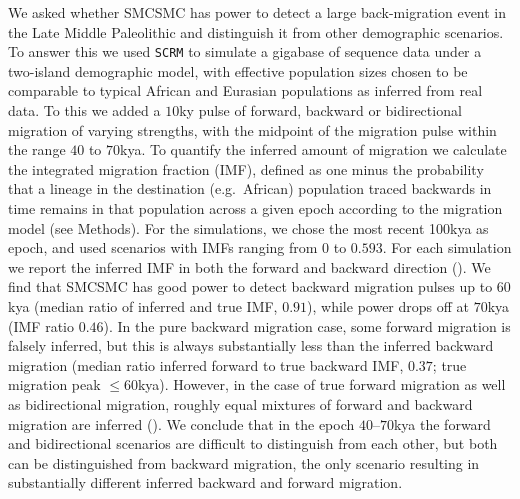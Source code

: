 We asked whether SMCSMC has power to detect a large back-migration event in the Late Middle Paleolithic and distinguish it from other demographic scenarios. To answer this we used {\tt SCRM} \cite{Staab2015} to simulate a gigabase of sequence data under a two-island demographic model,
with effective population sizes chosen to be comparable to typical African and Eurasian populations as inferred from real data. 
To this we added a $10$ky pulse of forward, backward or bidirectional migration of varying strengths, with the midpoint of the migration pulse within the range $40$ to $70$kya.  To quantify the inferred amount of migration we calculate the integrated migration fraction (IMF), defined as one minus the probability that a lineage in the destination (e.g.\ African) population traced backwards in time remains in that population across a given epoch according to the migration model (see Methods).  For the simulations, we chose the most recent 100kya as epoch, and used scenarios with IMFs ranging from $0$ to $0.593$. For each simulation we report the inferred IMF in both the forward and backward direction (). We find that SMCSMC has good power to detect backward migration pulses up to $60$kya (median ratio of inferred and true IMF, $0.91$), while power drops off at $70$kya (IMF ratio $0.46$). In the pure backward migration case, some forward migration is falsely inferred, but this is always substantially less than the inferred backward migration (median ratio inferred forward to true backward IMF, $0.37$; true migration peak $\leq 60$kya).  However, in the case of true forward migration as well as bidirectional migration, roughly equal mixtures of forward and backward migration are inferred (). We conclude that in the epoch $40$--$70$kya the forward and bidirectional scenarios are difficult to distinguish from each other, but both can be distinguished from backward migration, the only scenario resulting in substantially different inferred backward and forward migration.

